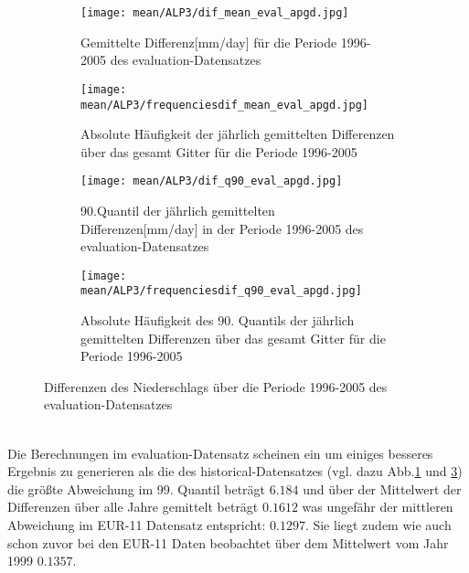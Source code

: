 \begin{figure}[hbt!]
	\begin{subfigure}{0.49\textwidth}
		\texttt{[image: mean/ALP3/dif\_mean\_eval\_apgd.jpg]}
		\caption{Gemittelte Differenz[mm/day] für die Periode 1996-2005 des evaluation-Datensatzes}
		\label{fig:dif_eval_apgd_mean}
	\end{subfigure}
	\begin{subfigure}{0.49\textwidth}
		\texttt{[image: mean/ALP3/frequenciesdif\_mean\_eval\_apgd.jpg]}
		\caption{Absolute Häufigkeit der jährlich gemittelten Differenzen über das gesamt Gitter für die Periode 1996-2005}
		\label{fig:freq_dif_eval_apgd_mean}
	\end{subfigure}
	\begin{subfigure}{0.49\textwidth}
		\texttt{[image: mean/ALP3/dif\_q90\_eval\_apgd.jpg]}
		\caption{90.Quantil der jährlich gemittelten Differenzen[mm/day] in der Periode 1996-2005 des evaluation-Datensatzes}
		\label{fig:dif_eval_apgd_q90}
	\end{subfigure}  
	\begin{subfigure}{0.49\textwidth}
		\texttt{[image: mean/ALP3/frequenciesdif\_q90\_eval\_apgd.jpg]}
		\caption{Absolute Häufigkeit des 90. Quantils der jährlich gemittelten Differenzen über das gesamt Gitter für die Periode 1996-2005}
		\label{fig:freq_dif_eval_apgd_q90}
	\end{subfigure}
	\caption{Differenzen des Niederschlags über die Periode 1996-2005 des evaluation-Datensatzes}
	\label{fig:mean_apgd_eval}
\end{figure}
\\
Die Berechnungen im evaluation-Datensatz scheinen ein um einiges besseres Ergebnis zu generieren als die des historical-Datensatzes (vgl. dazu Abb.\ref{fig:dif_eval_apgd_mean} und \ref{fig:dif_eval_apgd_q90}) die größte Abweichung im 99. Quantil beträgt $6.184$ und über der Mittelwert der Differenzen über alle Jahre gemittelt beträgt $0.1612$ was ungefähr der mittleren Abweichung im EUR-11 Datensatz entspricht: $0.1297$. Sie liegt zudem wie auch schon zuvor bei den EUR-11 Daten beobachtet über dem Mittelwert vom Jahr 1999 $0.1357$.\\ \pagebreak
